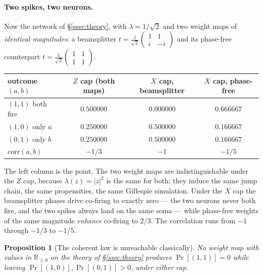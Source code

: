 \documentclass[11pt]{article}
\theoremstyle{definition}
\theoremstyle{plain}
\newtheorem{proposition}[definition]{Proposition}
\begin{document}
\paragraph{Two spikes, two neurons.}
Now the network of \S\ref{ssec:theory}, with $\lambda = 1/\sqrt{2}$ and two
weight maps of \emph{identical magnitudes}: a beamsplitter
$t = \frac{1}{\sqrt2}\left(\begin{smallmatrix} 1 & 1 \\ i & -i
\end{smallmatrix}\right)$ and its phase-free counterpart
$t = \frac{1}{\sqrt2}\left(\begin{smallmatrix} 1 & 1 \\ 1 & 1
\end{smallmatrix}\right)$.

\begin{center}
\small
\begin{tabular}{@{}lccc@{}}
\toprule
outcome $(a,b)$ & $Z$ cap (both maps) & $X$ cap, beamsplitter & $X$ cap, phase-free \\
\midrule
$(1,1)$ both fire   & $0.500000$ & $\mathbf{0.000000}$ & $0.666667$ \\
$(1,0)$ only $a$    & $0.250000$ & $0.500000$ & $0.166667$ \\
$(0,1)$ only $b$    & $0.250000$ & $0.500000$ & $0.166667$ \\
\midrule
$\mathrm{corr}(a,b)$ & $-1/3$ & $-1$ & $-1/5$ \\
\bottomrule
\end{tabular}
\end{center}

The left column is the point. The two weight maps are indistinguishable under
the $Z$ cap, because $\lambda(z) = |z|^2$ is the same for both; they induce the
same jump chain, the same propensities, the same Gillespie simulation. Under the
$X$ cap the beamsplitter phases drive co-firing to exactly zero --- the two
neurons never both fire, and the two spikes always land on the same soma ---
while phase-free weights of the same magnitude \emph{enhance} co-firing to
$2/3$. The correlation runs from $-1$ through $-1/3$ to $-1/5$.

\begin{proposition}[The coherent law is unreachable classically]\label{prop:unreachable}
No weight map with values in $\mathbb{R}_{\geq 0}$ on the theory of
\S\ref{ssec:theory} produces $\Pr[(1,1)] = 0$ while leaving
$\Pr[(1,0)], \Pr[(0,1)] > 0$, under either cap.
\end{proposition}
\end{document}
